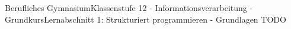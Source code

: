 \documentclass[11pt,oneside,openany,headings=optiontotoc,11pt,numbers=noenddot]{article}
\begin{document}
	\begin{worksheet}{Berufliches Gymnasium}{Klassenstufe 12 - Informationsverarbeitung - Grundkurs}{Lernabschnitt 1: Strukturiert programmieren - Grundlagen}
		\setlength{\columnseprule}{0pt}
		\noindent
		TODO
	\end{worksheet}
\end{document}
